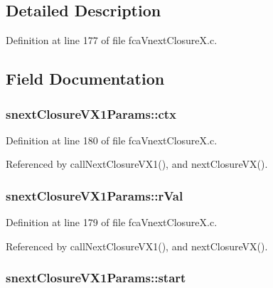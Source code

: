 \subsection{\-Detailed \-Description}


\-Definition at line 177 of file fca\-Vnext\-Closure\-X.\-c.



\subsection{\-Field \-Documentation}
\hypertarget{structsnextClosureVX1Params_af00ec23c26d8b4e217d29e5b949f285d}{
\subsubsection[{ctx}]{ {\bf snext\-Closure\-V\-X1\-Params\-::ctx}}}\label{structsnextClosureVX1Params_af00ec23c26d8b4e217d29e5b949f285d}


\-Definition at line 180 of file fca\-Vnext\-Closure\-X.\-c.



\-Referenced by call\-Next\-Closure\-V\-X1(), and next\-Closure\-V\-X().

\hypertarget{structsnextClosureVX1Params_a6cdec21a24ddae482ae521f8c560703a}{
\subsubsection[{r\-Val}]{ {\bf snext\-Closure\-V\-X1\-Params\-::r\-Val}}}\label{structsnextClosureVX1Params_a6cdec21a24ddae482ae521f8c560703a}


\-Definition at line 179 of file fca\-Vnext\-Closure\-X.\-c.



\-Referenced by call\-Next\-Closure\-V\-X1(), and next\-Closure\-V\-X().

\hypertarget{structsnextClosureVX1Params_a61ba68899ccb6dff43b95531868f5093}{
\subsubsection[{start}]{ {\bf snext\-Closure\-V\-X1\-Params\-::start}}}\label{structsnextClosureVX1Params_a61ba68899ccb6dff43b95531868f5093}


